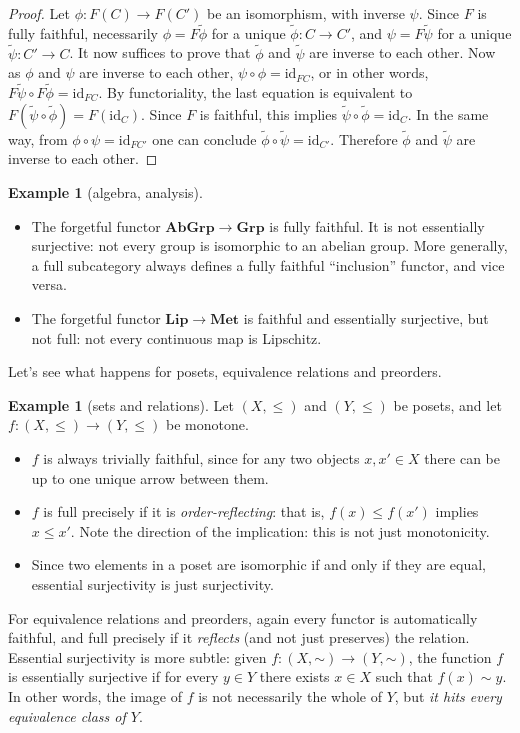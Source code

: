 \documentclass[12pt,oneside,headings=small]{scrbook}
\def\simord{\mathord\sim}
\numberwithin{equation}{section}
\theoremstyle{plain}
\theoremstyle{definition}
\newtheorem{eg}[thm]{Example}
\newcommand{\cat}[1]{{\mathbf{#1}}} %
\newcommand{\Grp}{\cat{Grp}}
\DeclareMathOperator{\1}{\mathbbm{1}}
\DeclareMathOperator{\2}{\mathbbm{2}}
\newcommand{\id}{\mathrm{id}} %
\begin{document}
\begin{proof}
 Let $\phi:F(C)\to F(C')$ be an isomorphism, with inverse $\psi$. Since $F$ is fully faithful, necessarily $\phi=F\tilde{\phi}$ for a unique $\tilde{\phi}:C\to C'$, and $\psi=F\tilde{\psi}$ for a unique $\tilde{\psi}:C'\to C$. It now suffices to prove that $\tilde{\phi}$ and $\tilde{\psi}$ are inverse to each other. Now as $\phi$ and $\psi$ are inverse to each other, $\psi\circ\phi=\id_{FC}$, or in other words, $F\tilde{\psi}\circ F\tilde{\phi}=\id_{FC}$. By functoriality, the last equation is equivalent to $F(\tilde{\psi}\circ \tilde{\phi})=F(\id_C)$. Since $F$ is faithful, this implies $\tilde{\psi}\circ \tilde{\phi}=\id_C$. In the same way, from $\phi\circ\psi=\id_{FC'}$ one can conclude $\tilde{\phi}\circ \tilde{\psi}=\id_{C'}$. Therefore $\tilde{\phi}$ and $\tilde{\psi}$ are inverse to each other.
\end{proof}


\begin{eg}[algebra, analysis]
\phantom{.}
 \begin{itemize}
  \item The forgetful functor $\cat{AbGrp}\to\Grp$ is fully faithful. It is not essentially surjective: not every group is isomorphic to an abelian group.
  More generally, a full subcategory always defines a fully faithful ``inclusion'' functor, and vice versa. 
  \item The forgetful functor $\cat{Lip}\to\cat{Met}$ is faithful and essentially surjective, but not full: not every continuous map is Lipschitz. 
 \end{itemize}
\end{eg}

Let's see what happens for posets, equivalence relations and preorders.

\begin{eg}[sets and relations]
 Let $(X,\le)$ and $(Y,\le)$ be posets, and let $f:(X,\le)\to (Y,\le)$ be monotone. 
 \begin{itemize}
  \item $f$ is always trivially faithful, since for any two objects $x,x'\in X$ there can be up to one unique arrow between them.
  \item $f$ is full precisely if it is \emph{order-reflecting}: that is, $f(x)\le f(x')$ implies $x\le x'$. Note the direction of the implication: this is not just monotonicity. 
  \item Since two elements in a poset are isomorphic if and only if they are equal, essential surjectivity is just surjectivity.
 \end{itemize}

 For equivalence relations and preorders, again every functor is automatically faithful, and full precisely if it \emph{reflects} (and not just preserves) the relation. Essential surjectivity is more subtle: given $f:(X,\simord)\to (Y,\simord)$, the function $f$ is essentially surjective if for every $y\in Y$ there exists $x\in X$ such that $f(x)\sim y$. In other words, the image of $f$ is not necessarily the whole of $Y$, but \emph{it hits every equivalence class of $Y$}. 
\end{eg}
\end{document}
